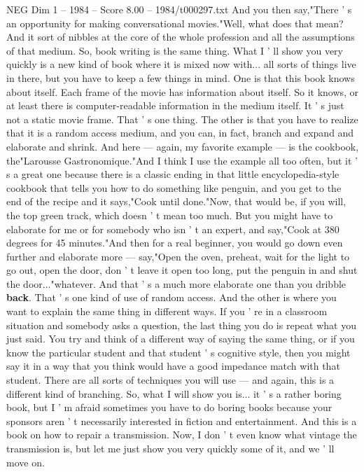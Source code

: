 \begin{textsample}{NEG Dim 1 – 1984 – Score 8.00 – 1984/t000297.txt}
And you then say,"There ' s an opportunity for making conversational movies."Well, what does that mean?
And it sort of nibbles at the core of the whole profession and all the assumptions of that medium.
So, book writing is the same thing.
What I ' ll show you very quickly is a new kind of book where it is mixed now with... all sorts of things live in there, but you have to keep a few things in mind.
One is that this book knows about itself.
Each frame of the movie has information about itself.
So it knows, or at least there is computer-readable information in the medium itself.
It ' s just not a static movie frame.
That ' s one thing.
The other is that you have to realize that it is a random access medium, and you can, in fact, branch and expand and elaborate and shrink.
And here — again, my favorite example — is the cookbook, the"Larousse Gastronomique."And I think I use the example all too often, but it ' s a great one because there is a classic ending in that little encyclopedia-style cookbook that tells you how to do something like penguin, and you get to the end of the recipe and it says,"Cook until done."Now, that would be, if you will, the top green track, which doesn ' t mean too much.
But you might have to elaborate for me or for somebody who isn ' t an expert, and say,"Cook at 380 degrees for 45 minutes."And then for a real beginner, you would go down even further and elaborate more — say,"Open the oven, preheat, wait for the light to go out, open the door, don ' t leave it open too long, put the penguin in and shut the door..."whatever.
And that ' s a much more elaborate one than you dribble \textbf{back}.
That ' s one kind of use of random access.
And the other is where you want to explain the same thing in different ways.
If you ' re in a classroom situation and somebody asks a question, the last thing you do is repeat what you just said.
You try and think of a different way of saying the same thing, or if you know the particular student and that student ' s cognitive style, then you might say it in a way that you think would have a good impedance match with that student.
There are all sorts of techniques you will use — and again, this is a different kind of branching.
So, what I will show you is... it ' s a rather boring book, but I ' m afraid sometimes you have to do boring books because your sponsors aren ' t necessarily interested in fiction and entertainment.
And this is a book on how to repair a transmission.
Now, I don ' t even know what vintage the transmission is, but let me just show you very quickly some of it, and we ' ll move on.

\end{textsample}
